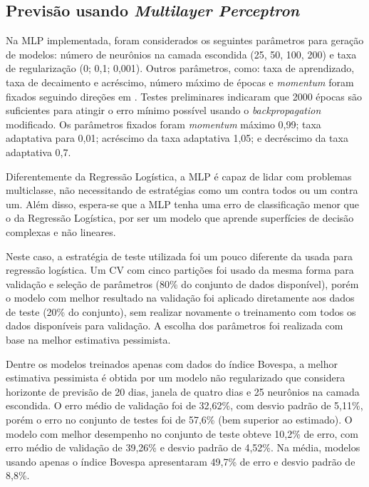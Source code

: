 \documentclass[12pt,a4paper,utf8]{ppgsi}
\begin{document}
    \subsection{Previsão usando \textit{Multilayer Perceptron}}

        Na MLP implementada, foram considerados os seguintes parâmetros para geração de modelos: número de neurônios na camada escondida (25, 50, 100, 200) e taxa de regularização (0; 0,1; 0,001). Outros parâmetros, como: taxa de aprendizado, taxa de decaimento e acréscimo, número máximo de épocas e \textit{momentum} foram fixados seguindo direções em \cite{haykin2009neural,SutskeverMartensDahlHinton_icml2013,lecun-efficient-backprop-1998,moreira-techrep}. Testes preliminares indicaram que 2000 épocas são suficientes para atingir o erro mínimo possível usando o \textit{backpropagation} modificado. Os parâmetros fixados foram \textit{momentum} máximo 0,99; taxa adaptativa para 0,01; acréscimo da taxa adaptativa 1,05; e decréscimo da taxa adaptativa 0,7.

        Diferentemente da Regressão Logística, a MLP é capaz de lidar com problemas multiclasse, não necessitando de estratégias como um contra todos ou um contra um. Além disso, espera-se que a MLP tenha uma erro de classificação menor que o da Regressão Logística, por ser um modelo que aprende superfícies de decisão complexas e não lineares.

       Neste caso, a estratégia de teste utilizada foi um pouco diferente da usada para regressão logística. Um CV com cinco partições foi usado da mesma forma para validação e seleção de parâmetros (80\% do conjunto de dados disponível), porém o modelo com melhor resultado na validação foi aplicado diretamente aos dados de teste (20\% do conjunto), sem realizar novamente o treinamento com todos os dados disponíveis para validação. A escolha dos parâmetros foi realizada com base na melhor estimativa pessimista.

            Dentre os modelos treinados apenas com dados do índice Bovespa, a melhor estimativa pessimista é obtida por um modelo não regularizado que considera horizonte de previsão de 20 dias, janela de quatro dias e 25 neurônios na camada escondida. O erro médio de validação foi de 32,62\%, com desvio padrão de 5,11\%, porém o erro no conjunto de testes foi de 57,6\% (bem superior ao estimado). O modelo com melhor desempenho no conjunto de teste obteve 10,2\% de erro, com erro médio de validação de 39,26\% e desvio padrão de 4,52\%. Na média, modelos usando apenas o índice Bovespa apresentaram 49,7\% de erro e desvio padrão de 8,8\%.
\end{document}
